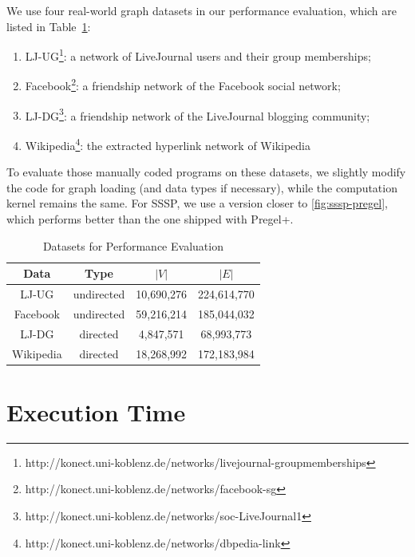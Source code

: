 \documentclass{sokendai_thesis} %
\begin{document}
We use four real-world graph datasets in our performance evaluation, which are listed in Table~\ref{tab:datasets}:
\begin{enumerate}\setlength\itemsep{0em}
\item LJ-UG\footnote{http://konect.uni-koblenz.de/networks/livejournal-groupmemberships}: a network of LiveJournal users and their group memberships;
\item Facebook\footnote{http://konect.uni-koblenz.de/networks/facebook-sg}: a friendship network of the Facebook social network;
\item LJ-DG\footnote{http://konect.uni-koblenz.de/networks/soc-LiveJournal1}: a friendship network of the LiveJournal blogging community;
\item Wikipedia\footnote{http://konect.uni-koblenz.de/networks/dbpedia-link}: the extracted hyperlink network of Wikipedia
\end{enumerate}
To evaluate those manually coded programs on these datasets, we slightly modify the code for graph loading (and data types if necessary), while the computation kernel remains the same.
For SSSP, we use a version closer to \autoref{fig:sssp-pregel}, which performs better than the one shipped with Pregel+.

\begin{table}[t]
 \centering
 \caption{Datasets for Performance Evaluation}
 \label{tab:datasets}
 \begin{tabular}{|c|c|c|c|}
  \hline
  Data & Type & $|V|$ & $|E|$ \\
  \hline\hline
  LJ-UG & undirected & 10,690,276 & 224,614,770 \\
  \hline
  Facebook & undirected & 59,216,214 & 185,044,032 \\
  \hline
  LJ-DG & directed & 4,847,571 & 68,993,773 \\
  \hline
  Wikipedia & directed & 18,268,992 & 172,183,984 \\
  \hline
 \end{tabular}
\end{table}

\section{Execution Time}
\end{document}
